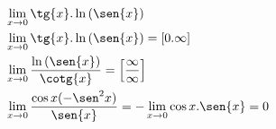 \begin{ex}
\begin{align}
&\lim_{x\rightarrow 0} \tg{x}.\ln{(\sen{x})}\nonumber\\
&\lim_{x\rightarrow 0} \tg{x}.\ln{(\sen{x})}= [0.\infty]\nonumber\\
&\lim_{x\rightarrow 0} \frac{\ln{(\sen{x})}}{\cotg{x}}=\left[\frac{\infty}{\infty}\right]\nonumber\\
&\lim_{x\rightarrow 0} \frac{\cos{x}(-\sen^2{x})}{\sen{x}}=-\lim_{x\rightarrow 0} \cos{x}.\sen{x}=0\nonumber
\end{align}
\end{ex}
